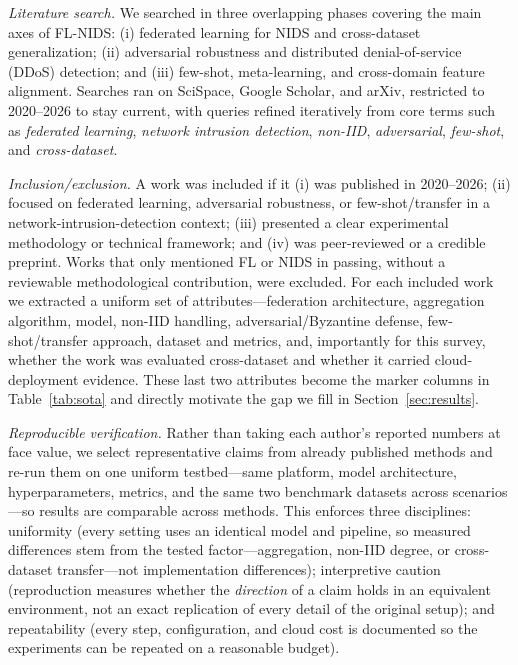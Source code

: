 \documentclass[conference]{IEEEtran}
\begin{document}
\textit{Literature search.} We searched in three overlapping phases covering the main
axes of FL-NIDS: (i) federated learning for NIDS and cross-dataset generalization;
(ii) adversarial robustness and distributed denial-of-service (DDoS) detection; and (iii) few-shot, meta-learning, and
cross-domain feature alignment. Searches ran on SciSpace, Google Scholar, and arXiv,
restricted to 2020--2026 to stay current, with queries refined iteratively from core
terms such as \textit{federated learning}, \textit{network intrusion detection},
\textit{non-IID}, \textit{adversarial}, \textit{few-shot}, and \textit{cross-dataset}.

\textit{Inclusion/exclusion.} A work was included if it (i) was published in
2020--2026; (ii) focused on federated learning, adversarial robustness, or
few-shot/transfer in a network-intrusion-detection context; (iii) presented a clear
experimental methodology or technical framework; and (iv) was peer-reviewed or a
credible preprint. Works that only mentioned FL or NIDS in passing, without a
reviewable methodological contribution, were excluded. For each included work we
extracted a uniform set of attributes---federation architecture, aggregation
algorithm, model, non-IID handling, adversarial/Byzantine defense, few-shot/transfer
approach, dataset and metrics, and, importantly for this survey, whether the work was
evaluated cross-dataset and whether it carried cloud-deployment evidence. These last
two attributes become the marker columns in Table~\ref{tab:sota} and directly motivate
the gap we fill in Section~\ref{sec:results}.

\textit{Reproducible verification.} Rather than taking each author's reported numbers
at face value, we select representative claims from already published methods and
re-run them on one uniform testbed---same platform, model architecture,
hyperparameters, metrics, and the same two benchmark datasets across scenarios---so
results are comparable across methods. This enforces three disciplines: uniformity
(every setting uses an identical model and pipeline, so measured differences stem from
the tested factor---aggregation, non-IID degree, or cross-dataset transfer---not
implementation differences); interpretive caution (reproduction measures whether the
\emph{direction} of a claim holds in an equivalent environment, not an exact
replication of every detail of the original setup); and repeatability (every step,
configuration, and cloud cost is documented so the experiments can be repeated on a
reasonable budget).
\end{document}
